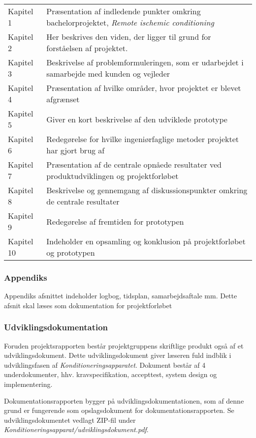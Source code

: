 	\begin{longtable}{ p{} p{} } 
		Kapitel 1 & Præsentation af indledende punkter omkring bachelorprojektet, \textit{Remote ischemic conditioning}\\
		Kapitel 2 & Her beskrives den viden, der ligger til grund for forståelsen af projektet. \\
		Kapitel 3 & Beskrivelse af problemformuleringen, som er udarbejdet i samarbejde med kunden og vejleder\\
		Kapitel 4 & Præsentation af hvilke områder, hvor projektet er blevet afgrænset\\
		Kapitel 5 & Giver en kort beskrivelse af den udviklede prototype\\
		Kapitel 6 & Redegørelse for hvilke ingeniørfaglige metoder projektet har gjort brug af \\
		Kapitel 7 & Præsentation af de centrale opnåede resultater ved produktudviklingen og projektforløbet\\
		Kapitel 8 & Beskrivelse og gennemgang af diskussionspunkter omkring de centrale resultater\\
		Kapitel 9 & Redegørelse af fremtiden for prototypen\\ 
		Kapitel 10& Indeholder en opsamling og konklusion på projektforløbet og prototypen\\
	\end{longtable}

\subsubsection{Appendiks}
Appendiks afsnittet indeholder logbog, tidsplan, samarbejdsaftale mm. Dette afsnit skal læses som dokumentation for projektforløbet

\subsubsection{Udviklingsdokumentation}
Foruden projektsrapporten består projektgruppens skriftlige produkt også af et udviklingsdokument. Dette udviklingsdokument giver læseren fuld indblik i udviklingsfasen af \textit{Konditioneringsapparatet}. Dokument består af 4 underdokumenter, hhv. kravspecifikation, accepttest, system design og implementering. 

Dokumentationsrapporten bygger på udviklingsdokumentationen, som af denne grund er fungerende som opslagsdokument for dokumentationsrapporten. Se udviklingsdokumentet vedlagt ZIP-fil under \textit{Konditioneringsapparat/udviklingsdokument.pdf}.



